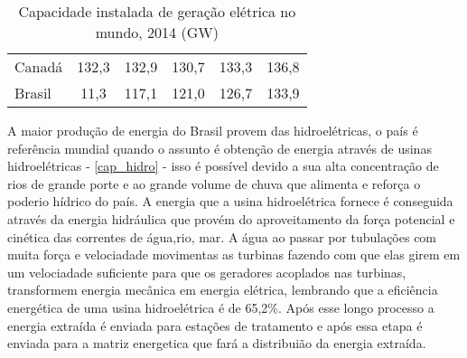 \begin{table}[!ht]
\begin{tabular}{lccccc}
		\rowcolor[HTML]{DDDDDD} 
		Canadá                                       & 132,3                                & 132,9                                & 130,7                                & 133,3                                & 136,8                                                                            \\
		Brasil                                       & 11,3                                 & 117,1                                & 121,0                                & 126,7                                & 133,9                                                                           
	\end{tabular}
	\caption{Capacidade instalada de geração elétrica no mundo, 2014 (GW)}
	\label{cap_ele}
\end{table}

A maior produção de energia do Brasil provem das hidroelétricas, o país é referência mundial quando o assunto é obtenção de energia através de
usinas hidroelétricas - \autoref{cap_hidro} - isso é possível devido a sua alta concentração de rios de grande porte e ao grande volume de chuva
que alimenta e reforça o poderio hídrico do país. A energia que a usina hidroelétrica fornece é conseguida através da energia hidráulica que provém
do aproveitamento da força potencial e cinética das correntes de água,rio, mar. A água ao passar por tubulações com muita força e velociadade 
movimentas as turbinas fazendo com que elas girem em um velociadade suficiente para que os geradores acoplados nas turbinas, transformem energia
mecânica em energia elétrica, lembrando que a eficiência energética de uma usina hidroelétrica é de 65,2\%. Após esse longo processo a energia 
extraída é enviada para estações de tratamento e após essa etapa é enviada para a matriz energetica que fará a distribuião da energia extraída. 

